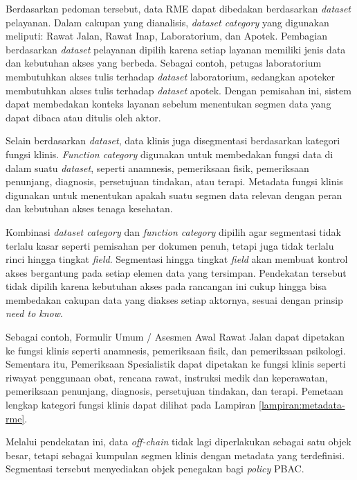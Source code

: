 Berdasarkan pedoman tersebut, data RME dapat dibedakan berdasarkan \textit{dataset} pelayanan. Dalam cakupan yang dianalisis, \textit{dataset category} yang digunakan meliputi: Rawat Jalan, Rawat Inap, Laboratorium, dan Apotek. Pembagian berdasarkan \textit{dataset} pelayanan dipilih karena setiap layanan memiliki jenis data dan kebutuhan akses yang berbeda. Sebagai contoh, petugas laboratorium membutuhkan akses tulis terhadap \textit{dataset} laboratorium, sedangkan apoteker membutuhkan akses tulis terhadap \textit{dataset} apotek. Dengan pemisahan ini, sistem dapat membedakan konteks layanan sebelum menentukan segmen data yang dapat dibaca atau ditulis oleh aktor.

Selain berdasarkan \textit{dataset}, data klinis juga disegmentasi berdasarkan kategori fungsi klinis. \textit{Function category} digunakan untuk membedakan fungsi data di dalam suatu \textit{dataset}, seperti anamnesis, pemeriksaan fisik, pemeriksaan penunjang, diagnosis, persetujuan tindakan, atau terapi. Metadata fungsi klinis digunakan untuk menentukan apakah suatu segmen data relevan dengan peran dan kebutuhan akses tenaga kesehatan.

Kombinasi \textit{dataset category} dan \textit{function category} dipilih agar segmentasi tidak terlalu kasar seperti pemisahan per dokumen penuh, tetapi juga tidak terlalu rinci hingga tingkat \textit{field}. Segmentasi hingga tingkat \textit{field} akan membuat kontrol akses bergantung pada setiap elemen data yang tersimpan. Pendekatan tersebut tidak dipilih karena kebutuhan akses pada rancangan ini cukup hingga bisa membedakan cakupan data yang diakses setiap aktornya, sesuai dengan prinsip \textit{need to know}.

Sebagai contoh, Formulir Umum / Asesmen Awal Rawat Jalan dapat dipetakan ke fungsi klinis seperti anamnesis, pemeriksaan fisik, dan pemeriksaan psikologi. Sementara itu, Pemeriksaan Spesialistik dapat dipetakan ke fungsi klinis seperti riwayat penggunaan obat, rencana rawat, instruksi medik dan keperawatan, pemeriksaan penunjang, diagnosis, persetujuan tindakan, dan terapi. Pemetaan lengkap kategori fungsi klinis dapat dilihat pada Lampiran \ref{lampiran:metadata-rme}.

Melalui pendekatan ini, data \textit{off-chain} tidak lagi diperlakukan sebagai satu objek besar, tetapi sebagai kumpulan segmen klinis dengan metadata yang terdefinisi. Segmentasi tersebut menyediakan objek penegakan bagi \textit{policy} PBAC.